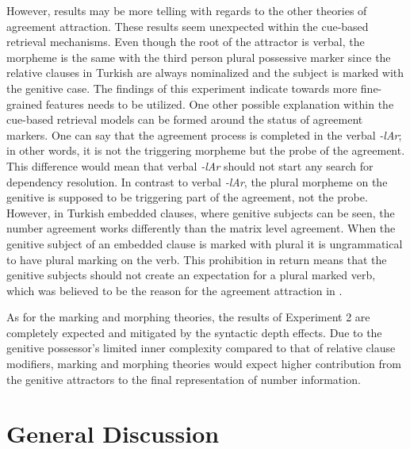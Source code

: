\documentclass[a4paper,man,natbib]{apa6}\usepackage[]{graphicx}\usepackage[]{color}
\begin{document}
However, results may be more telling with regards to the other theories of agreement attraction. These results seem unexpected within the cue-based retrieval mechanisms. Even though the root of the attractor is verbal, the morpheme is the same with the third person plural possessive marker since the relative clauses in Turkish are always nominalized and the subject is marked with the genitive case. The findings of this experiment indicate towards more fine-grained features needs to be utilized. One other possible explanation within the cue-based retrieval models can be formed around the status of agreement markers. One can say that the agreement process is completed in the verbal \textit{-lAr}; in other words, it is not the triggering morpheme but the probe of the agreement. This difference would mean that verbal \textit{-lAr} should not start any search for dependency resolution. In contrast to verbal \textit{-lAr}, the plural morpheme on the genitive is supposed to be triggering part of the agreement, not the probe. However, in Turkish embedded clauses, where genitive subjects can be seen, the number agreement works differently than the matrix level agreement. When the genitive subject of an embedded clause is marked with plural it is ungrammatical to have plural marking on the verb. 
This prohibition in return means that the genitive subjects should not create an expectation for a plural marked verb, which was believed to be the reason for the agreement attraction in \citet{LagoEtAl:2018}.


As for the marking and morphing theories, the results of Experiment 2 are completely expected and mitigated by the syntactic depth effects. Due to the genitive possessor's limited inner complexity compared to that of relative clause modifiers, marking and morphing theories would expect higher contribution from the genitive attractors to the final representation of number information. 


\section{General Discussion} \label{sec:general_discussion}




\end{document}
